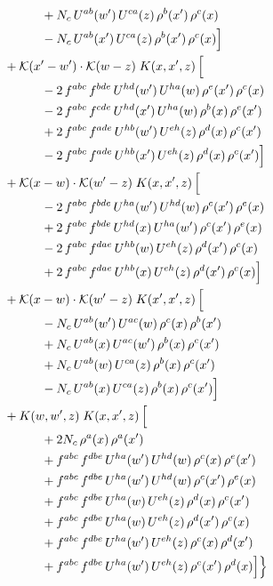 \documentclass[10pt]{article}
\numberwithin{equation}{section}
\newcommand{\KK}{\mathcal K}
\begin{document}
\begin{align}
&\qquad\qquad +N_c\,U^{ab}(w')\,U^{ca}(z)\,\rho^{b}(x')\,\rho^{c}(x)\notag\\
&\qquad\qquad - N_c\,U^{ab}(x')\,U^{ca}(z)\,\rho^{b}(x')\,\rho^{c}(x)\Big]\notag\\
&\quad +\KK(x'-w')\cdot\KK(w-z)\;K(x,x',z)\,\Big[\notag\\
&\qquad\qquad -2\,f^{abc}\,f^{bde}\,U^{hd}(w')\,U^{ha}(w)\,\rho^{e}(x')\,\rho^{c}(x)\notag\\
&\qquad\qquad -2\,f^{abc}\,f^{cde}\,U^{hd}(x')\,U^{ha}(w)\,\rho^{b}(x)\,\rho^{e}(x')\notag\\
&\qquad\qquad +2\,f^{abc}\,f^{ade}\,U^{hb}(w')\,U^{eh}(z)\,\rho^{d}(x)\,\rho^{c}(x')\notag\\
&\qquad\qquad -2\,f^{abc}\,f^{ade}\,U^{hb}(x')\,U^{eh}(z)\,\rho^{d}(x)\,\rho^{c}(x')\Big]\notag\\
&\quad +\KK(x-w)\cdot\KK(w'-z)\;K(x,x',z)\,\Big[\notag\\
&\qquad\qquad -2\,f^{abc}\,f^{bde}\,U^{ha}(w')\,U^{hd}(w)\,\rho^{c}(x')\,\rho^{e}(x)\notag\\
&\qquad\qquad +2\,f^{abc}\,f^{bde}\,U^{hd}(x)\,U^{ha}(w')\,\rho^{c}(x')\,\rho^{e}(x)\notag\\
&\qquad\qquad -2\,f^{abc}\,f^{dae}\,U^{hb}(w)\,U^{eh}(z)\,\rho^{d}(x')\,\rho^{c}(x)\notag\\
&\qquad\qquad +2\,f^{abc}\,f^{dae}\,U^{hb}(x)\,U^{eh}(z)\,\rho^{d}(x')\,\rho^{c}(x)\Big]\notag\\
&\quad +\KK(x-w)\cdot\KK(w'-z)\;K(x',x',z)\,\Big[\notag\\
&\qquad\qquad - N_c\,U^{ab}(w')\,U^{ac}(w)\,\rho^{c}(x)\,\rho^{b}(x')\notag\\
&\qquad\qquad +N_c\,U^{ab}(x)\,U^{ac}(w')\,\rho^{b}(x)\,\rho^{c}(x')\notag\\
&\qquad\qquad +N_c\,U^{ab}(w)\,U^{ca}(z)\,\rho^{b}(x)\,\rho^{c}(x')\notag\\
&\qquad\qquad - N_c\,U^{ab}(x)\,U^{ca}(z)\,\rho^{b}(x)\,\rho^{c}(x')\Big]\notag\\
&\quad +K(w,w',z)\;K(x,x',z)\,\Big[\notag\\
&\qquad\qquad +2 N_c\,\rho^{a}(x)\,\rho^{a}(x')\notag\\
&\qquad\qquad +f^{abc}\,f^{dbe}\,U^{ha}(w')\,U^{hd}(w)\,\rho^{c}(x)\,\rho^{e}(x')\notag\\
&\qquad\qquad +f^{abc}\,f^{dbe}\,U^{ha}(w')\,U^{hd}(w)\,\rho^{c}(x')\,\rho^{e}(x)\notag\\
&\qquad\qquad +f^{abc}\,f^{dbe}\,U^{ha}(w)\,U^{eh}(z)\,\rho^{d}(x)\,\rho^{c}(x')\notag\\
&\qquad\qquad +f^{abc}\,f^{dbe}\,U^{ha}(w)\,U^{eh}(z)\,\rho^{d}(x')\,\rho^{c}(x)\notag\\
&\qquad\qquad +f^{abc}\,f^{dbe}\,U^{ha}(w')\,U^{eh}(z)\,\rho^{c}(x)\,\rho^{d}(x')\notag\\
&\qquad\qquad +f^{abc}\,f^{dbe}\,U^{ha}(w')\,U^{eh}(z)\,\rho^{c}(x')\,\rho^{d}(x)\Big]\Big\}\label{eq:Bdecomp}
\end{align}
\end{document}
